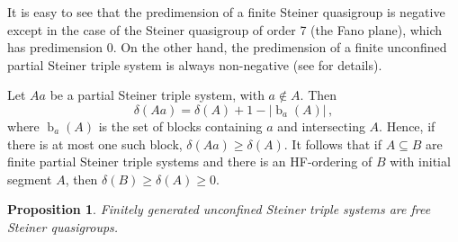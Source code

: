 \documentclass[10pt,a4paper]{article}
\DeclareMathOperator{\bl}{b}
\theoremstyle{note}
\newtheorem{prop}[thm]{Proposition}
\begin{document}
It is easy to see that the predimension of a finite Steiner quasigroup is negative except in the case of the Steiner quasigroup of order 7 (the Fano plane), which has predimension 0. On the other hand, the predimension of a finite unconfined partial Steiner triple system is always non-negative (see \cite{barcas3} for details).

 Let $Aa$ be a partial Steiner triple system, with $a\not\in A$. Then 
$$\delta(Aa)= \delta(A)+1-|\bl_a(A)| \, ,$$
 where $\bl_a(A)$ is the set of blocks containing $a$ and intersecting $A$. Hence, if there is at most one such block, $\delta(Aa)\geq \delta(A)$. It follows that if $A\subseteq B$ are finite partial Steiner triple systems and there is an HF-ordering of $B$ with initial segment $A$, then $\delta(B)\geq\delta(A)\geq 0$.

\begin{prop}\label{2024_nov4}
	Finitely generated unconfined Steiner triple systems are free Steiner quasigroups.
\end{prop}
\end{document}
